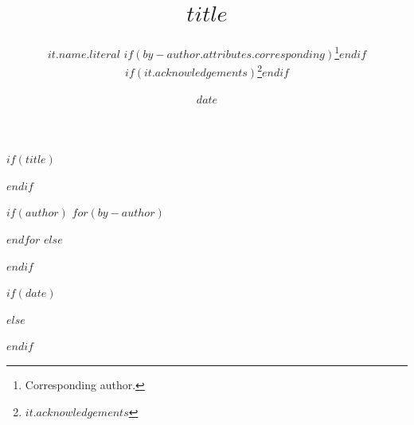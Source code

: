 $if(title)$
\title{$title$}
$endif$

$if(author)$
$for(by-author)$
\author{
  $it.name.literal$%
  $if(by-author.attributes.corresponding)$\thanks{Corresponding author.}$endif$%
  $if(it.acknowledgements)$\thanks{$it.acknowledgements$}$endif$  %
}

$endfor$
$else$%
\author{}
$endif$

$if(date)$
\date{$date$}
$else$
\date{}  %
$endif$
